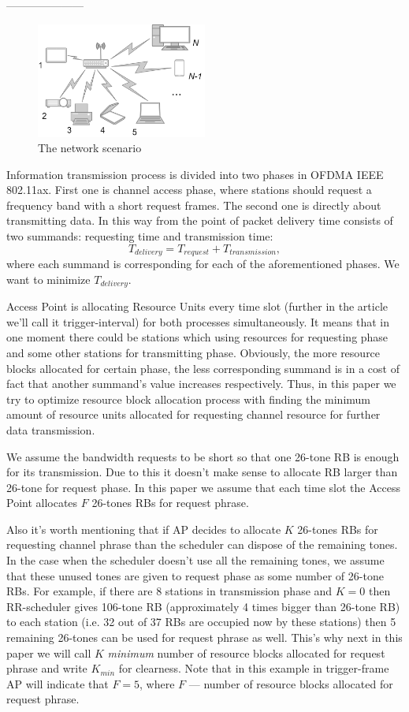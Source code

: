---------------------

\begin{figure}[tb]
	\includegraphics[width = 0.5\textwidth]{NetworkScenario}
	\caption{\label{fig:scenario} The network scenario}
\end{figure}

Information transmission process is divided into two phases in OFDMA IEEE 802.11ax. First one is channel access phase, where stations should request a frequency band with a short request frames. The second one is directly about transmitting data. In this way from the point of packet delivery time consists of two summands: requesting time and transmission time:
\[ T_{delivery} = T_{request} + T_{transmission}, \]
where each summand is corresponding for each of the aforementioned phases. We want to minimize $T_{delivery}$.

Access Point is allocating Resource Units every time slot (further in the article we'll call it trigger-interval) for both processes simultaneously. It means that in one moment there could be stations which using resources for requesting phase and some other stations for transmitting phase. Obviously, the more resource blocks allocated for certain phase, the less corresponding summand is in a cost of fact that another summand's value increases respectively. Thus, in this paper we try to optimize resource block allocation process with finding the minimum amount of resource units allocated for requesting channel resource for further data transmission.

We assume the bandwidth requests to be short so that one 26-tone RB is enough for its transmission. Due to this it doesn't make sense to allocate RB larger than 26-tone for request phase. In this paper we assume that each time slot the Access Point allocates $F$ 26-tones RBs for request phrase.

Also it's worth mentioning that if AP decides to allocate $K$ 26-tones RBs for requesting channel phrase than the scheduler can dispose of the remaining tones. In the case when the scheduler doesn't use all the remaining tones, we assume that these unused tones are given to request phase as some number of 26-tone RBs. For example, if there are 8 stations in transmission phase and $K=0$ then RR-scheduler gives 106-tone RB (approximately 4 times bigger than 26-tone RB) to each station (i.e. 32 out of 37 RBs are occupied now by these stations) then 5 remaining 26-tones can be used for request phrase as well. This's why next in this paper we will call $K$ \textit{minimum} number of resource blocks allocated for request phrase and write $K_{min}$ for clearness. Note that in this example in trigger-frame AP will indicate that $F = 5$, where $F$ --- number of resource blocks allocated for request phrase. 

